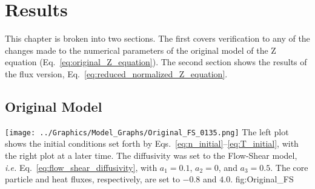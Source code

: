 \chapter{Results}\label{chapter:results}
This chapter is broken into two sections.
The first covers verification to any of the changes made to the numerical parameters of the original model of the Z equation (Eq.~\ref{eq:original_Z_equation}).
The second section shows the results of the flux version, Eq.~\ref{eq:reduced_normalized_Z_equation}.

\section{Original Model} \label{sec:original_results}
	{\texttt{[image: ../Graphics/Model\_Graphs/Original\_FS\_0135.png]}}
	{The left plot shows the initial conditions set forth by Eqs.~\ref{eq:n_initial}--\ref{eq:T_initial}, with the right plot at a later time.
	The diffusivity was set to the Flow-Shear model, \emph{i.e.} Eq.~\ref{eq:flow_shear_diffusivity}, with $a_1 = 0.1$, $a_2 = 0$, and $a_3 = 0.5$.
	The core particle and heat fluxes, respectively, are set to $-0.8$ and $4.0$.}
	{fig:Original_FS}

